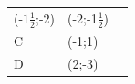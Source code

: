 {\begin{tabular}[t]{|l|l|l|}
    
        (-$1\frac{1}{2}$;-2) &
    
    
        (-2;-1$\frac{1}{2}$)%
     \tabularnewline\cline{1-1}\cline{2-2}\cline{3-3}
    
    
        C &
    
    
        (-1;1) &
    
    
     \tabularnewline\cline{1-1}\cline{2-2}\cline{3-3}
    
    
        D &
    
    
        (2;-3) &
    
    
     \tabularnewline\cline{1-1}\cline{2-2}\cline{3-3}
    \end{tabular}} %
        \addtolength{\mytableboxheight}{\mytableboxdepth}
        \addtocounter{footnote}{-0}
        

